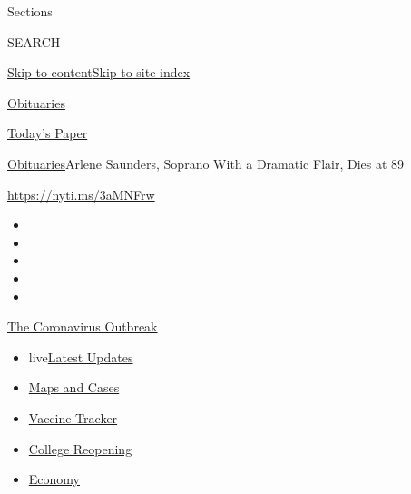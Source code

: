 Sections

SEARCH

\protect\hyperlink{site-content}{Skip to
content}\protect\hyperlink{site-index}{Skip to site index}

\href{https://www.nytimes3xbfgragh.onion/section/obituaries}{Obituaries}

\href{https://myaccount.nytimes3xbfgragh.onion/auth/login?response_type=cookie\&client_id=vi}{}

\href{https://www.nytimes3xbfgragh.onion/section/todayspaper}{Today's
Paper}

\href{/section/obituaries}{Obituaries}\textbar{}Arlene Saunders, Soprano
With a Dramatic Flair, Dies at 89

\url{https://nyti.ms/3aMNFrw}

\begin{itemize}
\item
\item
\item
\item
\item
\end{itemize}

\href{https://www.nytimes3xbfgragh.onion/news-event/coronavirus?action=click\&pgtype=Article\&state=default\&region=TOP_BANNER\&context=storylines_menu}{The
Coronavirus Outbreak}

\begin{itemize}
\tightlist
\item
  live\href{https://www.nytimes3xbfgragh.onion/2020/08/04/world/coronavirus-covid-19.html?action=click\&pgtype=Article\&state=default\&region=TOP_BANNER\&context=storylines_menu}{Latest
  Updates}
\item
  \href{https://www.nytimes3xbfgragh.onion/interactive/2020/us/coronavirus-us-cases.html?action=click\&pgtype=Article\&state=default\&region=TOP_BANNER\&context=storylines_menu}{Maps
  and Cases}
\item
  \href{https://www.nytimes3xbfgragh.onion/interactive/2020/science/coronavirus-vaccine-tracker.html?action=click\&pgtype=Article\&state=default\&region=TOP_BANNER\&context=storylines_menu}{Vaccine
  Tracker}
\item
  \href{https://www.nytimes3xbfgragh.onion/2020/08/02/us/covid-college-reopening.html?action=click\&pgtype=Article\&state=default\&region=TOP_BANNER\&context=storylines_menu}{College
  Reopening}
\item
  \href{https://www.nytimes3xbfgragh.onion/live/2020/08/03/business/stock-market-today-coronavirus?action=click\&pgtype=Article\&state=default\&region=TOP_BANNER\&context=storylines_menu}{Economy}
\end{itemize}

